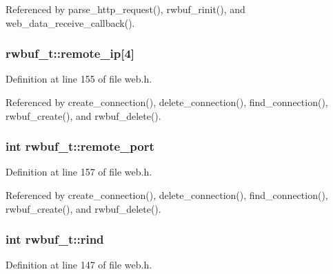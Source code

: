 Referenced by parse\+\_\+http\+\_\+request(), rwbuf\+\_\+rinit(), and web\+\_\+data\+\_\+receive\+\_\+callback().

\subsubsection[{\texorpdfstring{remote\+\_\+ip}{remote_ip}}]{ rwbuf\+\_\+t\+::remote\+\_\+ip\mbox{[}4\mbox{]}}\hypertarget{structrwbuf__t_ad83926198e358ac1a569b0da7749572c}{}\label{structrwbuf__t_ad83926198e358ac1a569b0da7749572c}


Definition at line 155 of file web.\+h.



Referenced by create\+\_\+connection(), delete\+\_\+connection(), find\+\_\+connection(), rwbuf\+\_\+create(), and rwbuf\+\_\+delete().

\subsubsection[{\texorpdfstring{remote\+\_\+port}{remote_port}}]{\setlength{\rightskip}{0pt plus 5cm}int rwbuf\+\_\+t\+::remote\+\_\+port}\hypertarget{structrwbuf__t_aace1e79a985cc8fab4c2093208bf3763}{}\label{structrwbuf__t_aace1e79a985cc8fab4c2093208bf3763}


Definition at line 157 of file web.\+h.



Referenced by create\+\_\+connection(), delete\+\_\+connection(), find\+\_\+connection(), rwbuf\+\_\+create(), and rwbuf\+\_\+delete().

\subsubsection[{\texorpdfstring{rind}{rind}}]{\setlength{\rightskip}{0pt plus 5cm}int rwbuf\+\_\+t\+::rind}\hypertarget{structrwbuf__t_ad5cbf7a78a5f5d9aa75b38f90e0fb6af}{}\label{structrwbuf__t_ad5cbf7a78a5f5d9aa75b38f90e0fb6af}


Definition at line 147 of file web.\+h.



